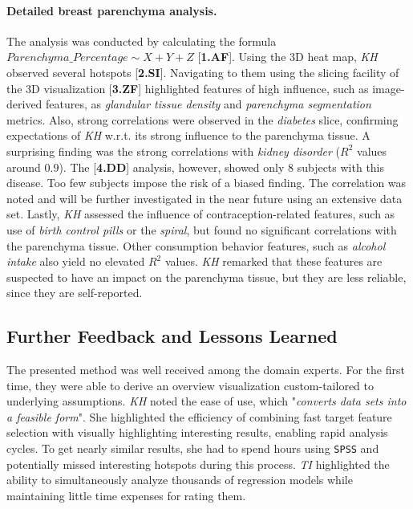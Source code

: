 \documentclass[journal]{style/vgtc} 			          %
\begin{document}
\paragraph{Detailed breast parenchyma analysis.}
The analysis was conducted by calculating the formula $Parenchyma\_Percentage \sim X + Y + Z$ [\textbf{1.AF}].
Using the 3D heat map, \emph{KH} observed several hotspots [\textbf{2.SI}].
Navigating to them using the slicing facility of the 3D visualization [\textbf{3.ZF}] highlighted features of high influence, such as image-derived features, as \emph{glandular tissue density} and \emph{parenchyma segmentation} metrics.
Also, strong correlations were observed in the \emph{diabetes} slice, confirming expectations of \emph{KH} w.r.t. its strong influence to the parenchyma tissue.
A surprising finding was the strong correlations with \emph{kidney disorder} ($R^2$ values around $0.9$).
The [\textbf{4.DD}] analysis, however, showed only 8 subjects with this disease.
Too few subjects impose the risk of a biased finding.
The correlation was noted and will be further investigated in the near future using an extensive data set.
Lastly, \emph{KH} assessed the influence of contraception-related features, such as use of \emph{birth control pills} or the \emph{spiral}, but found no significant correlations with the parenchyma tissue.
Other consumption behavior features, such as \emph{alcohol intake} also yield no elevated $R^2$ values.
\emph{KH} remarked that these features are suspected to have an impact on the parenchyma tissue, but they are less reliable, since they are self-reported.
\subsection{Further Feedback and Lessons Learned} \label{Lessons Learned}
The presented method was well received among the domain experts.
For the first time, they were able to derive an overview visualization custom-tailored to underlying assumptions.
\emph{KH} noted the ease of use, which "\emph{converts data sets into a feasible form}".
She highlighted the efficiency of combining fast target feature selection with visually highlighting interesting results, enabling rapid analysis cycles.
To get nearly similar results, she had to spend hours using \texttt{SPSS} and potentially missed interesting hotspots during this process.
\emph{TI} highlighted the ability to simultaneously analyze thousands of regression models while maintaining little time expenses for rating them.
\end{document}
